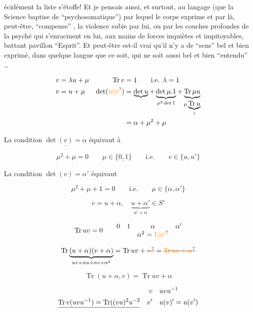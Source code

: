 écidément la liste  s'étoffe! Et je pensais aussi, et surtout, au langage (que la Science baptise de ``psychosomatique'') par lequel le corps exprime et par là, peut-être, ``compense'' , la violence subie par lui, ou par les couches profondes de la psyché qui s'enracinent en lui, aux mains de forces inquiètes et impitoyables, battant  pavillon ``Esprit''. Et peut-être est-il vrai qu'il n'y a de ``sens'' bel et bien exprimé,  dans quelque langue que ce soit, qui ne soit aussi bel et bien ``entendu'' \ldots

\[
\begin{aligned}
v&=\lambda u+\mu&\operatorname{Tr}v&=1\qquad\text{i.e. }\lambda=1\\
v&=u+\mu&\det(\unsure{w|v})&=\underbrace{\det u}+\underbrace{\det\mu.1}_{\mu^2\det1}+\underbrace{\operatorname{Tr}\mu u}_{\mu\underbrace{\operatorname{Tr}u}_{1}}\\
&&&=\alpha+\mu^2+\mu
\end{aligned}
\]

La condition $\underline{\det(v)=\alpha}$ équivaut à

\[
\mu^2+\mu=0\qquad\mu\in\{\underline{0,1}\}\qquad\text{i.e.}\qquad v\in\{u,u'\}
\]

La condition $\det(v)=\alpha'$ équivaut 

\[
\mu^2+\mu+1=0\qquad\text{i.e.}\qquad\mu\in\{\alpha,\alpha'\}
\]

\[
v=u+\alpha,\quad \underbrace{u+\alpha'}_{u'+\alpha}\in S'
\]

\[
\operatorname{Tr}uv=0\qquad\begin{matrix}0&1&\alpha&\alpha'\\&&\alpha^2=\unsure{1|\alpha'}&\end{matrix}
\]

\[
\operatorname{Tr}\underbrace{(u+\alpha)(v+\alpha)}_{uv+\alpha u+\alpha v+\alpha^2}
=\operatorname{Tr}uv+\deleted{\unsure{\alpha}}=\deleted{\unsure{\operatorname{Tr}uv+\alpha}}
\]

\[
\operatorname{Tr}(u+\alpha,v)=\operatorname{Tr}uv+\alpha
\]

\[
\begin{aligned}
&&v&\quad uvu^{-1}\\
\deleted{\operatorname{Tr}v(uvu^{-1})=\operatorname{Tr}((vu)^2u^{-2}}&&v'&\quad u(v)'=u(v')
\end{aligned}
\]

